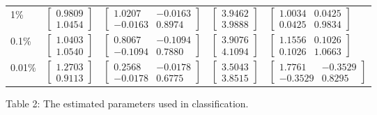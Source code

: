 \documentclass[ 12pt ]{article}
\begin{document}
\begin{enumerate}
\begin{enumerate}
\begin{center}
\begin{tabular}{|l|llll|}
                    1\%    & $\begin{bmatrix} 0.9809 \\ 1.0454 \end{bmatrix}$ & $\begin{bmatrix} 1.0207 & -0.0163 \\ -0.0163 & 0.8974 \end{bmatrix}$ & $\begin{bmatrix} 3.9462 \\ 3.9888 \end{bmatrix}$ & $\begin{bmatrix} 1.0034 &  0.0425 \\  0.0425 & 0.9834 \end{bmatrix}$\\
                    0.1\%  & $\begin{bmatrix} 1.0403 \\ 1.0540 \end{bmatrix}$ & $\begin{bmatrix} 0.8067 & -0.1094 \\ -0.1094 & 0.7880 \end{bmatrix}$ & $\begin{bmatrix} 3.9076 \\ 4.1094 \end{bmatrix}$ & $\begin{bmatrix} 1.1556 &  0.1026 \\  0.1026 & 1.0663 \end{bmatrix}$\\
                    0.01\% & $\begin{bmatrix} 1.2703 \\ 0.9113 \end{bmatrix}$ & $\begin{bmatrix} 0.2568 & -0.0178 \\ -0.0178 & 0.6775 \end{bmatrix}$ & $\begin{bmatrix} 3.5043 \\ 3.8515 \end{bmatrix}$ & $\begin{bmatrix} 1.7761 & -0.3529 \\ -0.3529 & 0.8295 \end{bmatrix}$\\
                    \hline
                \end{tabular}
                \scriptsize
                    Table 2: The estimated parameters used in classification.
                \end{center}



\end{enumerate}
\end{enumerate}
\end{document}

